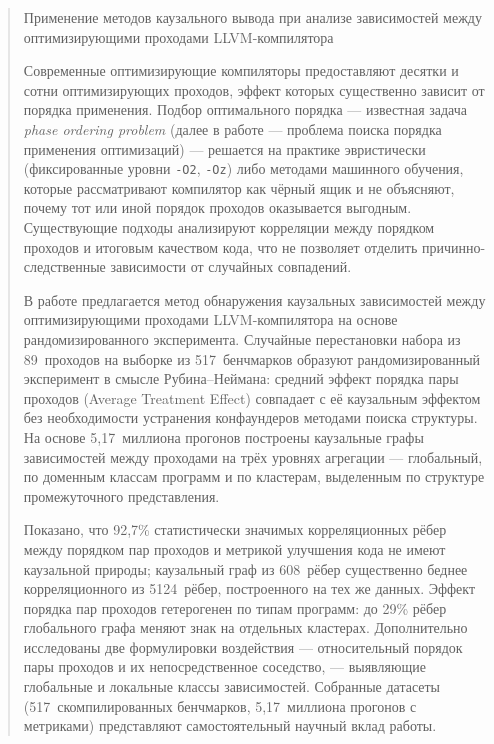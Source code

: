 \begin{abstract}

\begin{center}

\large{Применение методов каузального вывода при анализе зависимостей между оптимизирующими проходами LLVM-компилятора} \\

\end{center}

\vspace{0.5cm}

Современные оптимизирующие компиляторы предоставляют десятки и сотни оптимизирующих проходов, эффект которых существенно зависит от порядка применения. Подбор оптимального порядка --- известная задача \emph{phase ordering problem} (далее в работе --- проблема поиска порядка применения оптимизаций) --- решается на практике эвристически (фиксированные уровни \texttt{-O2}, \texttt{-Oz}) либо методами машинного обучения, которые рассматривают компилятор как чёрный ящик и не объясняют, почему тот или иной порядок проходов оказывается выгодным. Существующие подходы анализируют корреляции между порядком проходов и итоговым качеством кода, что не позволяет отделить причинно-следственные зависимости от случайных совпадений.

В работе предлагается метод обнаружения каузальных зависимостей между оптимизирующими проходами LLVM-компилятора на основе рандомизированного эксперимента. Случайные перестановки набора из 89~проходов на выборке из 517~бенчмарков образуют рандомизированный эксперимент в смысле Рубина--Неймана: средний эффект порядка пары проходов (Average Treatment Effect) совпадает с её каузальным эффектом без необходимости устранения конфаундеров методами поиска структуры. На основе 5,17~миллиона прогонов построены каузальные графы зависимостей между проходами на трёх уровнях агрегации --- глобальный, по доменным классам программ и по кластерам, выделенным по структуре промежуточного представления.

Показано, что 92{,}7\% статистически значимых корреляционных рёбер между порядком пар проходов и метрикой улучшения кода не имеют каузальной природы; каузальный граф из 608~рёбер существенно беднее корреляционного из 5124~рёбер, построенного на тех же данных. Эффект порядка пар проходов гетерогенен по типам программ: до 29\% рёбер глобального графа меняют знак на отдельных кластерах. Дополнительно исследованы две формулировки воздействия --- относительный порядок пары проходов и их непосредственное соседство, --- выявляющие глобальные и локальные классы зависимостей. Собранные датасеты (517~скомпилированных бенчмарков, 5,17~миллиона прогонов с метриками) представляют самостоятельный научный вклад работы.

\end{abstract}

\newpage
